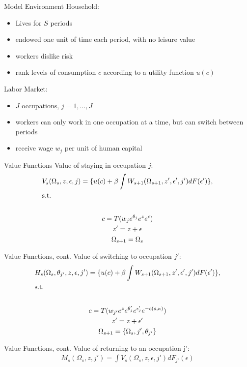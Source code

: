 \documentclass{beamer}
\begin{document}
\begin{frame}{Model Environment}
  Household:
  \begin{itemize}
    \item Lives for $S$ periods
    \item endowed one unit of time each period, with no leisure value
    \item workers dislike risk
    \item rank levels of consumption $c$ according to a utility function $u(c)$
  \end{itemize}
  \pause
  Labor Market:
  \begin{itemize}
    \item $J$ occupations, $j=1,...,J$
    \item workers can only work in one occupation at a time, but can switch between periods
    \item receive wage $w_j$ per unit of human capital
  \end{itemize}
\end{frame}
\begin{frame}{Value Functions}
  Value of staying in occupation $j$:
  \begin{gather*}
    V_s(\Omega_s, z, \epsilon, j) = \{u(c) + \beta\int W_{s+1}(\Omega_{s+1}, z', \epsilon', j')dF(\epsilon')\}, \\
    \shortintertext{s.t.} \\
    c = T(w_je^{\theta_j}e^ze^{\epsilon}) \\
    z' = z + \epsilon \\
    \Omega_{s+1} = \Omega_s
  \end{gather*}
\end{frame}
\begin{frame}{Value Functions, cont.}
  Value of switching to occupation $j'$:
  \begin{gather*}
    H_s(\Omega_s, \theta_{j'}, z, \epsilon, j') = \{u(c) + \beta\int W_{s+1}(\Omega_{s+1}, z', \epsilon', j')dF(\epsilon')\}, \\
    \shortintertext{s.t.} \\
    c = T(w_{j'}e^ze^{\theta_j'}e^{\epsilon_j'}e^{-c(s,\kappa)}) \\
    z' = z+ \epsilon' \\
    \Omega_{s+1} = \{\Omega_s, j', \theta_{j'}\}
  \end{gather*}
\end{frame}

\begin{frame}{Value Functions, cont.}
  Value of returning to an occupation j':
  \begin{gather*}
    M_s(\Omega_s, z, j') = \int V_s(\Omega_s, z, \epsilon, j')dF_{j'}(\epsilon)
  \end{gather*}
\end{frame}
\end{document}

